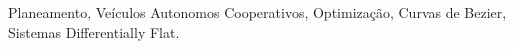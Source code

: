 \noindent Planeamento, Veículos Autonomos Cooperativos, Optimização, Curvas de Bezier, Sistemas Differentially Flat.

